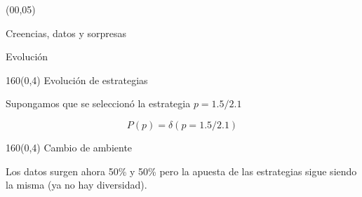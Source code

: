\documentclass[shownotes,aspectratio=169]{beamer}
\begin{document}
\color{black!85}
\large

\begin{frame}
 
 \begin{textblock}{90}(00,05)
\begin{center}
 \huge  \textcolor{black!66}{Creencias, datos y sorpresas}
\end{center}
\end{textblock}

{}
\end{frame}




\begin{frame}[plain]

\centering \Large

Evoluci\'on

\end{frame}



\begin{frame}[plain]
\begin{textblock}{160}(0,4)
\centering \Large Evolución de estrategias
\end{textblock}
\vspace{0.75cm}

\centering
{}
 \vspace{1.5cm}
 \pause
 
 Supongamos que se seleccionó la estrategia $p=1.5/2.1$

 \begin{equation}
 P(p) = \delta(p=1.5/2.1)
 \end{equation}
 
\end{frame}


\begin{frame}[plain]
\begin{textblock}{160}(0,4)
\centering \Large Cambio de ambiente
\end{textblock}
\vspace{0.75cm}

Los datos surgen ahora 50\% y 50\% pero la apuesta de las estrategias sigue siendo la misma (ya no hay diversidad).

\end{frame}
\end{document}
